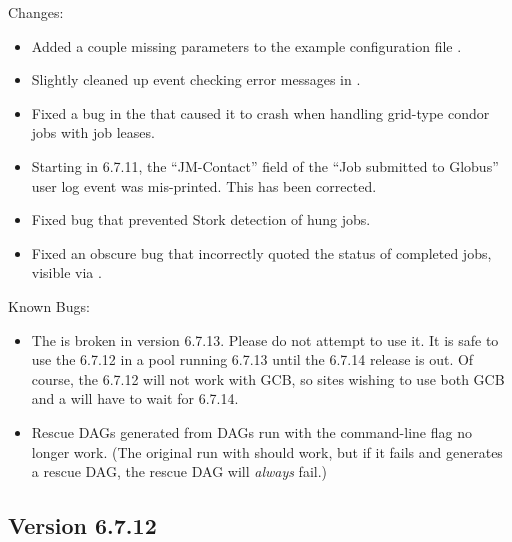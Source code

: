 \noindent Changes:

\begin{itemize}

\item Added a couple missing parameters to the example configuration file
.

\item Slightly cleaned up event checking error messages in .

\item Fixed a bug in the  that caused it to crash when
handling grid-type condor jobs with job leases.

\item Starting in 6.7.11, the ``JM-Contact'' field of the ``Job submitted
to Globus'' user log event was mis-printed. This has been corrected.

\item Fixed bug that prevented Stork detection of hung jobs.

\item Fixed an obscure bug that incorrectly quoted the status of completed
jobs, visible via .

\end{itemize}

\noindent Known Bugs:

\begin{itemize}

\item The  is broken in version 6.7.13.
Please do not attempt to use it.
It is safe to use the 6.7.12  in a pool running
6.7.13 until the 6.7.14 release is out.
Of course, the 6.7.12  will not work with GCB, so
sites wishing to use both GCB and a  will have to
wait for 6.7.14.

\item Rescue DAGs generated from DAGs run with the
 command-line flag no longer work.
(The original run with  should work,
but if it fails and generates a rescue DAG, the
rescue DAG will \emph{always} fail.)

\end{itemize}


\subsection*{\label{sec:New-6-7.12}Version 6.7.12}

